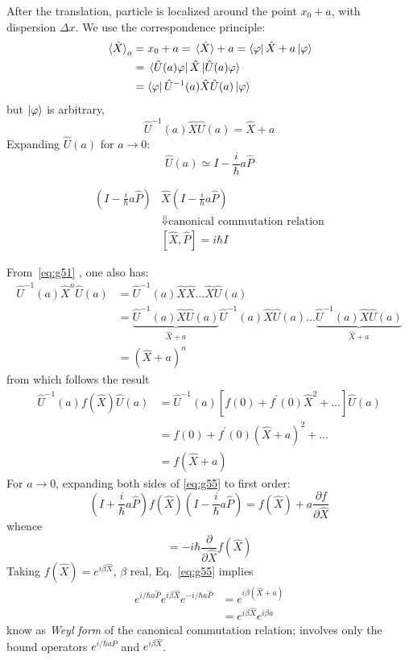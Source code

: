 \documentclass[12pt]{article}
\newcommand{\be}{\begin{equation}}
\newcommand{\ee}{\end{equation}}
\begin{document}
After the translation, particle is localized around the
point $x_0 + a$, with dispersion $\Delta x$.
We use the correspondence principle:
\be
\begin{aligned}
\ev*{\hat{X}}_a
&= x_0+a = \ev*{\hat{X}} + a 
= \bra{\varphi}\hat{X}+a\ket{\varphi}\\
&=\bra*{\hat{U}(a)\varphi}\hat{X}\ket*{\hat{U}(a)\varphi}\\
&=\bra{\varphi}\hat{U}^{-1}(a)\hat{X}\hat{U}(a)\ket{\varphi}
\end{aligned}
\ee
but $\ket{\varphi}$ is arbitrary,
\be
\hat{U}^{-1}(a)\hat{X}\hat{U}(a) = \hat{X} + a
\label{eq:g51}
\ee
Expanding $\hat{U}(a)$ for $a \to 0$:
\be
\hat{U}(a) \simeq I - \frac{i}{\hbar} a \hat{P}
\ee

\be
\begin{aligned}
\left(I - \frac{i}{\hbar} a \hat{P}\right)
&\hat{X}
\left(I - \frac{i}{\hbar} a \hat{P}\right)\\
&\Downarrow \text{canonical commutation relation}\\
&[\hat{X},\hat{P}] = i\hbar I
\end{aligned}
\ee

From~\eqref{eq:g51}
, one also has:
\be
\begin{aligned}
\hat{U}^{-1}(a)\hat{X}^n\hat{U}(a) 
&=\hat{U}^{-1}(a)\hat{X}\hat{X}\ldots\hat{X}\hat{U}(a)\\
&=\underbrace{\hat{U}^{-1}(a)\hat{X}\hat{U}(a)}%
_{\hat{X}+a}
\hat{U}^{-1}(a)\hat{X}\hat{U}(a)
\ldots
\underbrace{\hat{U}^{-1}(a)\hat{X}\hat{U}(a)}%
_{\hat{X}+a}\\
&=(\hat{X}+a)^n
\end{aligned}
\ee
from which follows the result
\be
\begin{aligned}
\hat{U}^{-1}(a)f(\hat{X})\hat{U}(a) 
&= \hat{U}^{-1}(a)
[f(0) + f^\prime(0)\hat{X}^2 + \ldots]
\hat{U}(a)\\
&=f(0) + f^\prime(0)(\hat{X}+a)^2 + \ldots\\
&=f(\hat{X}+a)
\end{aligned}
\label{eq:g55}
\ee
For $a \to 0$, expanding both sides of \eqref{eq:g55}
to first order:
\[
\left(I + \frac{i}{\hbar} a \hat{P}\right) f(\hat{X}) \left(I - \frac{i}{\hbar} a \hat{P}\right) = 
f(\hat{X}) + a \frac{\partial f}{\partial\hat{X}}
\]
whence
\be
[\hat{P},f(\hat{X})] = -i\hbar\frac{\partial}{\partial\hat{X}}f(\hat{X})
\ee
\setcounter{equation}{53}
Taking $f(\hat{X}) = e^{i\beta\hat{X}}$, $\beta$ real, Eq.~\eqref{eq:g55}
implies
\be
\begin{aligned}
e^{i/\hbar a\hat{P}} e^{i\beta\hat{X}} e^{-i/\hbar a\hat{P}}
&= e^{i\beta(\hat{X}+a)}\\
&= e^{i\beta\hat{X}} e^{i\beta a}
\end{aligned}
\ee
know as \emph{Weyl form} of the canonical
commutation relation; involves only the
bound operators $e^{i/\hbar a\hat{P}}$ and $e^{i\beta\hat{X}}$.
\end{document}
